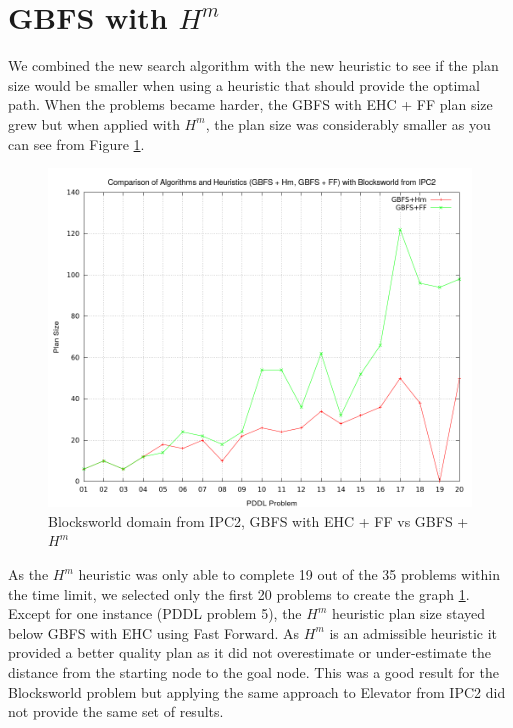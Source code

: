 \section{GBFS with $H^m$}
We combined the new search algorithm with the new heuristic to see if the plan size would be smaller when using a heuristic that should provide the optimal path. When the problems became harder, the GBFS with EHC + FF plan size grew but when applied with $H^m$, the plan size was considerably smaller as you can see from Figure \ref{fig:BlocksworldDomainGBFSwithHm}.
\begin{figure}[!htb]
    \centering
    \includegraphics[scale=0.35]{BlocksworldPlanSizeGwithCP.png}
    \caption{Blocksworld domain from IPC2, GBFS with EHC + FF vs GBFS + $H^m$ }
    \label{fig:BlocksworldDomainGBFSwithHm}
\end{figure}
As the $H^m$ heuristic was only able to complete 19 out of the 35 problems within the time limit, we selected only the first 20 problems to create the graph \ref{fig:BlocksworldDomainGBFSwithHm}. Except for one instance (PDDL problem 5), the $H^m$ heuristic plan size stayed below GBFS with EHC using Fast Forward. As $H^m$ is an admissible heuristic it provided a better quality plan as it did not overestimate or under-estimate the distance from the starting node to the goal node.  
This was a good result for the Blocksworld problem but applying the same approach to Elevator from IPC2 did not provide the same set of results. 
